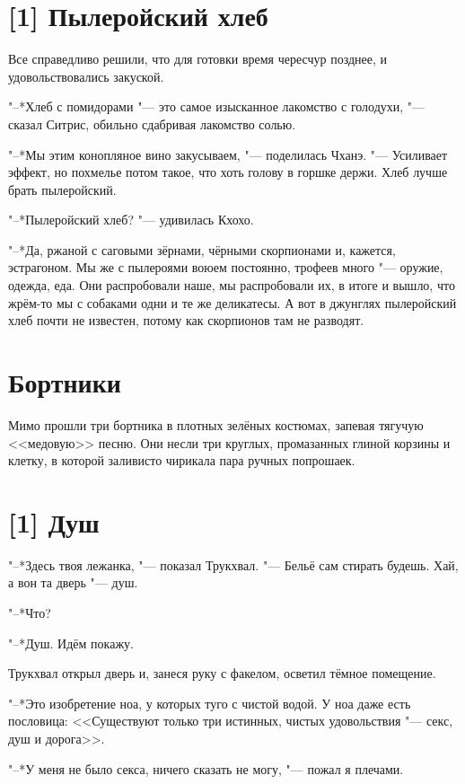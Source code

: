 \section{[1] Пылеройский хлеб}

Все справедливо решили, что для готовки время чересчур позднее, и удовольствовались закуской.

"--*Хлеб с помидорами "--- это самое изысканное лакомство с голодухи, "--- сказал Ситрис, обильно сдабривая лакомство солью.

"--*Мы этим конопляное вино закусываем, "--- поделилась Чханэ.
"--- Усиливает эффект, но похмелье потом такое, что хоть голову в горшке держи.
Хлеб лучше брать пылеройский.

"--*Пылеройский хлеб? "--- удивилась Кхохо.

"--*Да, ржаной с саговыми зёрнами, чёрными скорпионами и, кажется, эстрагоном.
Мы же с пылероями воюем постоянно, трофеев много "--- оружие, одежда, еда.
Они распробовали наше, мы распробовали их, в итоге и вышло, что жрём-то мы с собаками одни и те же деликатесы.
А вот в джунглях пылеройский хлеб почти не известен, потому как скорпионов там не разводят.

\section{Бортники}

Мимо прошли три бортника в плотных зелёных костюмах, запевая тягучую <<медовую>> песню.
Они несли три круглых, промазанных глиной корзины и клетку, в которой заливисто чирикала пара ручных попрошаек.

\section{[1] Душ}

"--*Здесь твоя лежанка, "--- показал Трукхвал.
"--- Бельё сам стирать будешь.
Хай, а вон та дверь "--- душ.

"--*Что?

"--*Душ.
Идём покажу.

Трукхвал открыл дверь и, занеся руку с факелом, осветил тёмное помещение.

"--*Это изобретение ноа, у которых туго с чистой водой.
У ноа даже есть пословица: <<Существуют только три истинных, чистых удовольствия "--- секс, душ и дорога>>.

"--*У меня не было секса, ничего сказать не могу, "--- пожал я плечами.

